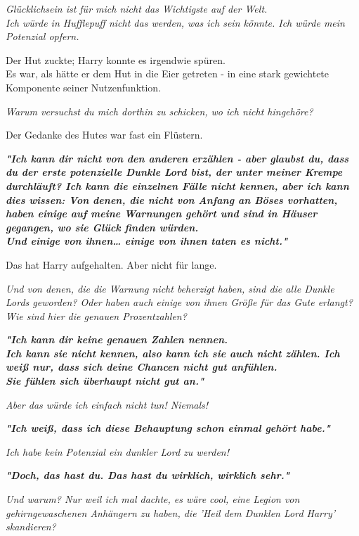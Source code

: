 {\emph{Glücklichsein ist für mich nicht das Wichtigste auf der Welt.\\ Ich würde in Hufflepuff nicht das werden, was ich sein könnte. Ich würde mein Potenzial opfern.}

Der Hut zuckte; Harry konnte es irgendwie spüren.\\ Es war, als hätte er dem Hut in die Eier getreten - in eine stark gewichtete Komponente seiner Nutzenfunktion.

\emph{Warum versuchst du mich dorthin zu schicken, wo ich nicht hingehöre?}

Der Gedanke des Hutes war fast ein Flüstern.

\textbf{\emph{"Ich kann dir nicht von den anderen erzählen - aber glaubst du, dass du der erste potenzielle Dunkle Lord bist, der unter meiner Krempe durchläuft? Ich kann die einzelnen Fälle nicht kennen, aber ich kann dies wissen: Von denen, die nicht von Anfang an Böses vorhatten, haben einige auf meine Warnungen gehört und sind in Häuser gegangen, wo sie Glück finden würden.\\ Und einige von ihnen… einige von ihnen taten es nicht."}}

Das hat Harry aufgehalten. Aber nicht für lange.

\emph{Und von denen, die die Warnung nicht beherzigt haben, sind die alle Dunkle Lords geworden? Oder haben auch einige von ihnen Größe für das Gute erlangt? Wie sind hier die genauen Prozentzahlen?}

\textbf{\emph{"Ich kann dir keine genauen Zahlen nennen.\\ Ich kann sie nicht kennen, also kann ich sie auch nicht zählen. Ich weiß nur, dass sich deine Chancen nicht gut anfühlen.\\ Sie fühlen sich überhaupt nicht gut an."}}

\emph{Aber das würde ich einfach nicht tun! Niemals!}

\textbf{\emph{"Ich weiß, dass ich diese Behauptung schon einmal gehört habe."}}

\emph{Ich habe kein Potenzial ein dunkler Lord zu werden!}

\textbf{\emph{"Doch, das hast du. Das hast du wirklich, wirklich sehr."}}

\emph{Und warum? Nur weil ich mal dachte, es wäre cool, eine Legion von gehirngewaschenen Anhängern zu haben, die 'Heil dem Dunklen Lord Harry' skandieren?}

}
